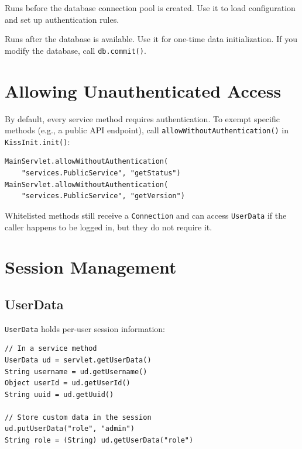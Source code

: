 \begin{description}[style=nextline]
  \item[\texttt{init()}] Runs before the database connection pool is created.  Use it to load configuration and set up authentication rules.
  \item[\texttt{init2(Connection db)}] Runs after the database is available.  Use it for one-time data initialization.  If you modify the database, call \texttt{db.commit()}.
\end{description}

\section{Allowing Unauthenticated Access}
\label{sec:auth-whitelist}

By default, every service method requires authentication.  To exempt specific methods (e.g., a public API endpoint), call \texttt{allowWithoutAuthentication()} in \texttt{KissInit.init()}:

\begin{lstlisting}[style=groovy]
MainServlet.allowWithoutAuthentication(
    "services.PublicService", "getStatus")
MainServlet.allowWithoutAuthentication(
    "services.PublicService", "getVersion")
\end{lstlisting}

\noindent
Whitelisted methods still receive a \texttt{Connection} and can access \texttt{UserData} if the caller happens to be logged in, but they do not require it.

\section{Session Management}
\label{sec:auth-sessions}

\subsection{UserData}

\texttt{UserData} holds per-user session information:

\begin{lstlisting}[style=groovy]
// In a service method
UserData ud = servlet.getUserData()
String username = ud.getUsername()
Object userId = ud.getUserId()
String uuid = ud.getUuid()

// Store custom data in the session
ud.putUserData("role", "admin")
String role = (String) ud.getUserData("role")
\end{lstlisting}

